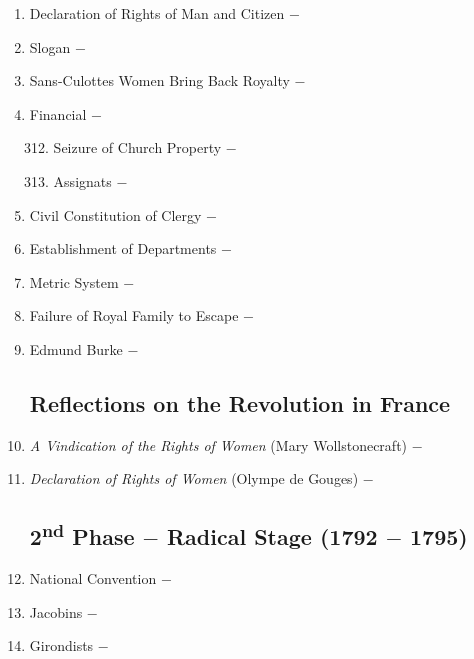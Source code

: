 \documentclass[12pt]{article}
\begin{document}
\begin{enumerate}
\item Declaration of Rights of Man and Citizen $-$ 

\item Slogan $-$ 

\item Sans-Culottes Women Bring Back Royalty $-$ 

\item Financial $-$ 

\begin{enumerate}[label=\arabic{*}.]
\setcounter{enumii}{311}

\item Seizure of Church Property $-$

\item Assignats $-$ 

\end{enumerate}
\setcounter{enumi}{313}

\item Civil Constitution of Clergy $-$ 

\item Establishment of Departments $-$ 

\item Metric System $-$ 

\item Failure of Royal Family to Escape $-$ 

\item Edmund Burke $-$

\subsection{Reflections on the Revolution in France}

\item \textit{A Vindication of the Rights of Women} (Mary Wollstonecraft) $-$

\item \textit{Declaration of Rights of Women} (Olympe de Gouges) $-$

\subsection{2\textsuperscript{nd} Phase $-$ Radical Stage (1792 $-$ 1795)}

\item National Convention $-$ 

\item Jacobins $-$ 

\item Girondists $-$ 


\end{enumerate}
\end{document}
